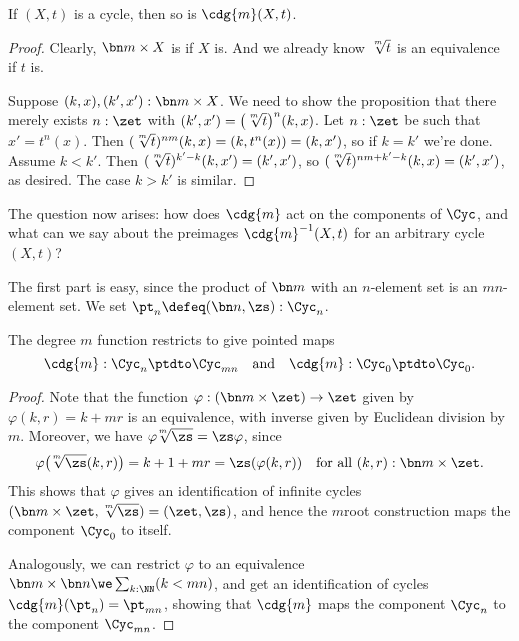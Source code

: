 \begin{lemma}
  If $(X,t)$ is a cycle, then so is $\cdg{m}(X,t)$.
\end{lemma}
\begin{proof}
  Clearly, $\bn m\times X$ is \nonempty if $X$ is.
  And we already know $\sqrt[\uproot{2}m]{t}$ is an equivalence if $t$ is.

  Suppose $(k,x),(k',x'):\bn m\times X$.
  We need to show the proposition that there merely exists $n:\zet$
  with $(k',x') = \bigl(\sqrt[\uproot{2}m]t\bigr)^n(k,x)$.
  Let $n:\zet$ be such that $x' = t^n(x)$.
  Then $(\sqrt[\uproot{2}m]t)^{nm}(k,x) = (k,t^n(x)) = (k,x')$,
  so if $k=k'$ we're done.
  Assume $k<k'$. Then $(\sqrt[\uproot{2}m]t)^{k'-k}(k,x') = (k',x')$,
  so $(\sqrt[\uproot{2}m]t)^{nm+k'-k}(k,x) = (k',x')$, as desired.
  The case $k>k'$ is similar.
\end{proof}

The question now arises: how does $\cdg{m}$ act on the components of $\Cyc$,
and what can we say about the preimages $\cdg{m}^{-1}(X,t)$
for an arbitrary cycle $(X,t)$?

The first part is easy, since the product of $\bn m$ with an $n$-element set
is an $mn$-element set. We set $\pt_n \defeq (\bn n,\zs) : \Cyc_n$.
\begin{lemma}
  The degree $m$ function restricts to give pointed maps
  \[
    \cdg{m} : \Cyc_n \ptdto \Cyc_{mn} \quad\text{and}\quad
    \cdg{m} : \Cyc_0 \ptdto \Cyc_0.
  \]
\end{lemma}
\begin{proof}
  Note
  that the function $\varphi : (\bn m\times \zet) \to \zet$
  given by $\varphi(k,r)=k+mr$ is an equivalence,
  with inverse given by Euclidean division by $m$.
  Moreover, we have ${\varphi\!\sqrt[\uproot{2}m]\zs} = {\zs\varphi}$, since
  \[
    \varphi\bigl(\!\sqrt[\uproot{2}m]\zs(k,r)\bigr)
    = k+1+mr = \zs(\varphi(k,r))
    \quad\text{for all $(k,r):\bn m\times \zet$}.
  \]
  This shows that $\varphi$ gives an identification of infinite cycles
  $(\bn m\times\zet, \sqrt[\uproot{2}m]\zs) = (\zet,\zs)$,
  and hence the $m$\th root construction maps the component $\Cyc_0$ to itself.

  Analogously, we can restrict $\varphi$ to
  an equivalence $\bn m \times \bn n \we \sum_{k:\NN}(k<mn)$,
  and get an identification of cycles $\cdg{m}(\pt_n) = \pt_{mn}$,
  showing that $\cdg{m}$ maps the component $\Cyc_n$ to the component $\Cyc_{mn}$.
\end{proof}

